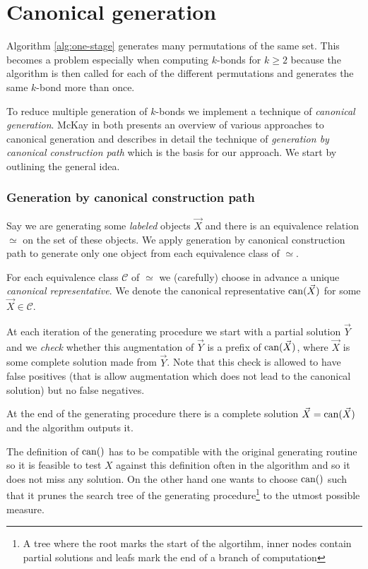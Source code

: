 \chapter{Canonical generation}
\label{ch:canonical}

Algorithm \ref{alg:one-stage} generates many permutations of the same set. This becomes a problem especially when computing $k$-bonds for $k \geq 2$ because the algorithm is then called for each of the different permutations and generates the same $k$-bond more than once.

To reduce multiple generation of $k$-bonds we implement a technique of \textit{canonical generation}. McKay in \cite{mckay_isom} both presents an overview of various approaches to canonical generation and describes in detail the technique of \textit{generation by canonical construction path} which is the basis for our approach. We start by outlining the general idea.

\subsection*{Generation by canonical construction path}

Say we are generating some \textit{labeled} objects $\vec X$ and there is an equivalence relation $\simeq$ on the set of these objects. We apply generation by canonical construction path to generate only one object from each equivalence class of $\simeq$.

For each equivalence class $\mathcal{C}$ of $\simeq$ we (carefully) choose in advance a unique \textit{canonical representative}. We denote the canonical representative $\operatorname{can}(\vec X)$ for some $\vec X \in \mathcal{C}$.

At each iteration of the generating procedure we start with a partial solution $\vec Y$ and we \textit{check} whether this augmentation of $\vec Y$ is a prefix of $\operatorname{can}(\vec X)$, where $\vec X$ is some complete solution made from $\vec Y$. Note that this check is allowed to have false positives (that is allow augmentation which does not lead to the canonical solution) but no false negatives.

At the end of the generating procedure there is a complete solution \linebreak ${\vec X = \operatorname{can}(\vec{X}) }$ and the algorithm outputs it.

\sectionline

The definition of $\operatorname{can}()$ has to be compatible with the original generating routine so it is feasible to test $X$ against this definition often in the algorithm and so it does not miss any solution. On the other hand one wants to choose $\operatorname{can}()$ such that it prunes the search tree of the generating procedure\footnote{A tree where the root marks the start of the algortihm, inner nodes contain partial solutions and leafs mark the end of a branch of computation} to the utmost possible measure.

